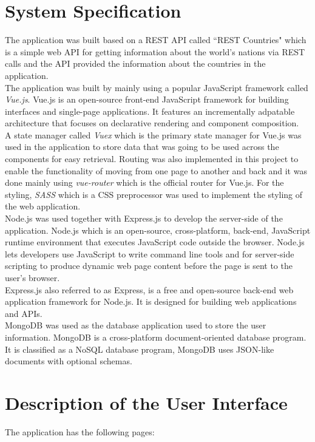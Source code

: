 \documentclass[twoside, a4paper, 12pt]{report}
\begin{document}
\section{System Specification}
The application was built based on a REST API called ``REST Countries" which is a simple web API for getting information about the world's nations via REST calls and the API provided the information about the countries in the application.\\ 
\indent
The application was built by mainly using a popular JavaScript framework called \emph{Vue.js}. Vue.js is an open-source front-end JavaScript framework for building interfaces and single-page applications. It features an incrementally adpatable architecture that focuses on declarative rendering and component composition.\\ 
\indent
A state manager called \emph{Vuex} which is the primary state manager for Vue.js was used in the application to store data that was going to be used across the components for easy retrieval. Routing was also implemented in this project to enable the functionality of moving from one page to another and back and it was done mainly using \emph{vue-router} which is the official router for Vue.js. For the styling, \emph{SASS} which is a CSS preprocessor was used to implement the styling of the web application.\\
\indent
Node.js was used together with Express.js to develop the server-side of the application. Node.js which is an open-source, cross-platform, back-end, JavaScript runtime environment that executes JavaScript code outside the browser. Node.js lets developers use JavaScript to write command line tools and for server-side scripting to produce dynamic web page content before the page is sent to the user's browser.\\
\indent
Express.js also referred to as Express, is a free and open-source back-end web application framework for Node.js. It is designed for building web applications and APIs.\\
\indent
MongoDB was used as the database application used to store the user information. MongoDB is a cross-platform document-oriented database program. It is classified as a NoSQL database program, MongoDB uses JSON-like documents with optional schemas.

\section{Description of the User Interface}
The application has the following pages:
\end{document}

